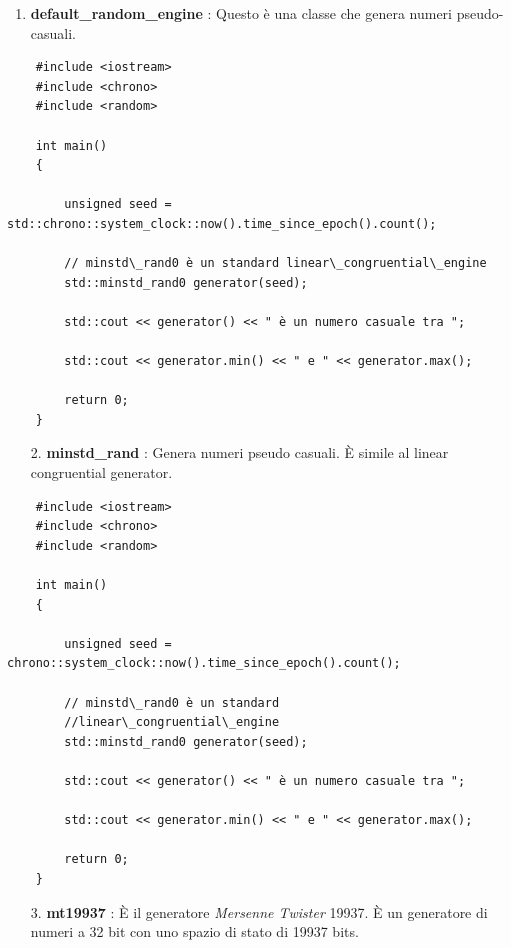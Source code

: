 \begin{enumerate}
	\item \textsf{\small \textbf{default\_random\_engine} : Questo è una classe che genera numeri pseudo-casuali.} \\
\end{enumerate}

\begin{lstlisting}
	#include <iostream>
	#include <chrono>
	#include <random>
	
	int main()
	{
		
		unsigned seed = std::chrono::system_clock::now().time_since_epoch().count();
		
		// minstd\_rand0 è un standard linear\_congruential\_engine
		std::minstd_rand0 generator(seed);
		
		std::cout << generator() << " è un numero casuale tra ";
		
		std::cout << generator.min() << " e " << generator.max();
		
		return 0;
	}
\end{lstlisting}

\begin{enumerate}
	\item[2.] \textsf{\small \textbf{minstd\_rand} : Genera numeri pseudo casuali. È simile al linear congruential generator.} \\
\end{enumerate}

\begin{lstlisting}
	#include <iostream>
	#include <chrono>
	#include <random>
	
	int main()
	{
		
		unsigned seed = chrono::system_clock::now().time_since_epoch().count();
		
		// minstd\_rand0 è un standard
		//linear\_congruential\_engine
		std::minstd_rand0 generator(seed);
		
		std::cout << generator() << " è un numero casuale tra ";
		
		std::cout << generator.min() << " e " << generator.max();
		
		return 0;
	}
\end{lstlisting}

\begin{enumerate}
	\item[3.] \textsf{\small \textbf{mt19937} : È il generatore \emph{Mersenne Twister} 19937. È un generatore di numeri a 32 bit con uno spazio di stato di 19937 bits.} \\
\end{enumerate}

